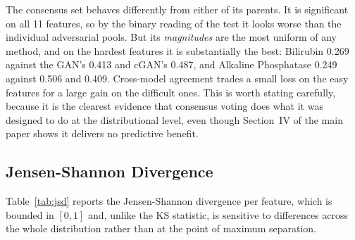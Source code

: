 \documentclass[journal,onecolumn]{IEEEtran}
\begin{document}
The consensus set behaves differently from either of its parents. It is significant on all 11 features, so by the binary reading of the test it looks worse than the individual adversarial pools. But its \emph{magnitudes} are the most uniform of any method, and on the hardest features it is substantially the best: Bilirubin 0.269 against the GAN's 0.413 and cGAN's 0.487, and Alkaline Phosphatase 0.249 against 0.506 and 0.409. Cross-model agreement trades a small loss on the easy features for a large gain on the difficult ones. This is worth stating carefully, because it is the clearest evidence that consensus voting does what it was designed to do at the distributional level, even though Section~IV of the main paper shows it delivers no predictive benefit.

\subsection{Jensen-Shannon Divergence}

Table~\ref{tab:jsd} reports the Jensen-Shannon divergence per feature, which is bounded in $[0,1]$ and, unlike the KS statistic, is sensitive to differences across the whole distribution rather than at the point of maximum separation.

\begin{table}[!t]
  \centering
  \caption{Jensen-Shannon Divergence Between Synthetic and Real Training Distributions. Lower is Better}
  \label{tab:jsd}
\end{table}
\end{document}
